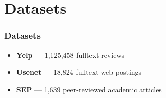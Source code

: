\documentclass[t]{beamer}
\begin{document}
%
%
%
%
%
%
%
%
%
%
%
%
%
%

\section{Datasets}
\begin{frame}
\frametitle{Datasets}
\begin{itemize}
\item \textbf{Yelp} --- 1,125,458 fulltext reviews
\item \textbf{Usenet} --- 18,824 fulltext web postings
\item \textbf{SEP} --- 1,639 peer-reviewed academic articles
\end{itemize}
\end{frame}
\end{document}
